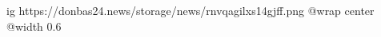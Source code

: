  
 
 
 
 

\ifcmt
  ig https://donbas24.news/storage/news/rnvqagilxs14gjff.png
  @wrap center
  @width 0.6
\fi
